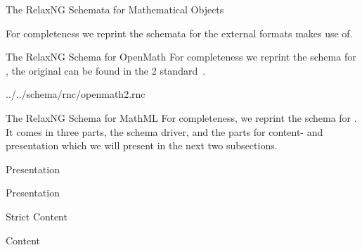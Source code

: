
\begin{tchapter}[id=mobj-rnc]{The RelaxNG Schemata for Mathematical Objects}

For completeness we reprint the {\relaxng} schemata for the external formats
{\omdoc} makes use of.
\begin{tsection}[id=rnc:openmath]{The RelaxNG Schema for OpenMath}
  For completeness we reprint the {\relaxng} schema for {\openmath}, the original
  can be found in the {\openmath}2 standard~\cite{BusCapCar:2oms04}.
  
  {../../schema/rnc/openmath2.rnc}
\end{tsection}

\begin{tsection}[id=rnc:mathml]{The RelaxNG Schema for MathML}
  For completeness, we reprint the {\relaxng} schema for {\mathml}. It comes in three
  parts, the schema driver, and the parts for content- and presentation {\mathml} which we
  will present in the next two subsections.
  

\begin{tsubsection}[id=rnc:mathml-common]{Presentation {\mathml}}
  
\end{tsubsection}

\begin{tsubsection}[id=rnc:pmathml]{Presentation {\mathml}}
  
\end{tsubsection}

\begin{tsubsection}[id=rnc:strict-cmathml]{Strict Content {\mathml}}
  
\end{tsubsection}

\begin{tsubsection}[id=rnc:cmathml]{Content {\mathml}}
  
\end{tsubsection}
\end{tsection}
\end{tchapter}



